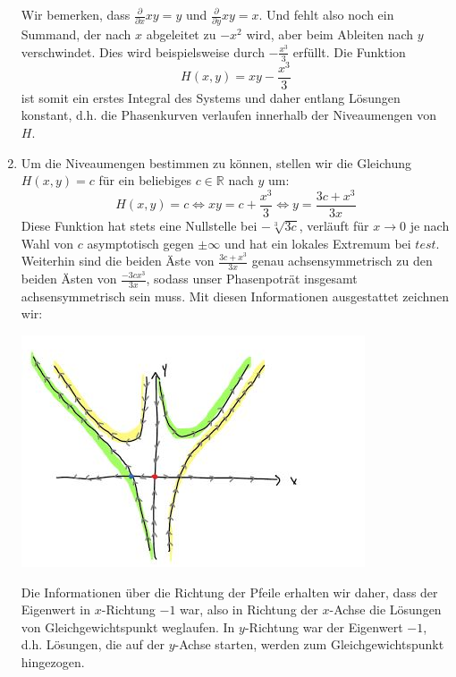 \documentclass[a4paper]{article}
\begin{document}
\begin{enumerate}
    Wir bemerken, dass $\frac{\partial}{\partial x} xy = y$ und $\frac{\partial}{\partial y} xy = x$.
    Und fehlt also noch ein Summand, der nach $x$ abgeleitet zu $-x^2$ wird, aber beim Ableiten nach $y$ verschwindet.
    Dies wird beispielsweise durch $-\frac{x^3}{3}$ erfüllt.
    Die Funktion
    \begin{equation*}
        H(x,y) = xy - \frac{x^3}{3}
    \end{equation*}
    ist somit ein erstes Integral des Systems und daher entlang Lösungen konstant, d.h. die Phasenkurven verlaufen innerhalb der Niveaumengen von $H$.
    \item Um die Niveaumengen bestimmen zu können, stellen wir die Gleichung $H(x,y) = c$ für ein beliebiges $c \in \mathds{R}$ nach $y$ um:
    \begin{equation*}
        H(x,y) = c \iff xy = c + \frac{x^3}{3} \iff y = \frac{3c + x^3}{3x}
    \end{equation*} 
    Diese Funktion hat stets eine Nullstelle bei $-\sqrt[3]{3c}$, verläuft für $x \to 0$ je nach Wahl von $c$ asymptotisch gegen $\pm \infty$ und hat ein lokales Extremum bei $ test $.
    Weiterhin sind die beiden Äste von $\frac{3c + x^3}{3x}$ genau achsensymmetrisch zu den beiden Ästen von $\frac{-3c x^3}{3x}$, sodass unser Phasenpoträt insgesamt achsensymmetrisch sein muss.
    Mit diesen Informationen ausgestattet zeichnen wir:

    \begin{center}
        \includegraphics[width=0.8\textwidth]{phasenpotrait.jpeg}
    \end{center}

    Die Informationen über die Richtung der Pfeile erhalten wir daher, dass der Eigenwert in $x$-Richtung $-1$ war, also in Richtung der $x$-Achse die Lösungen von Gleichgewichtspunkt weglaufen. In $y$-Richtung war der Eigenwert $-1$, d.h. Lösungen, die auf der $y$-Achse starten, werden zum Gleichgewichtspunkt hingezogen.
\end{enumerate}
\end{document}
